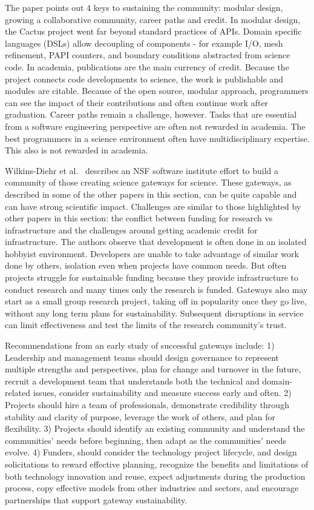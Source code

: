 \documentclass[11pt, oneside]{amsart}
\begin{document}
The paper points out 4 keys to sustaining the community: modular design,
growing a collaborative community, career paths and credit. In modular design,
the Cactus project went far beyond standard practices of APIs. Domain specific
languages (DSLs) allow decoupling of components - for example I/O, mesh
refinement, PAPI counters, and boundary conditions abstracted from science
code. In academia, publications are the main currency of credit. Because the
project connects code developments to science, the work is publishable and
modules are citable. Because of the open source, modular approach, programmers
can see the impact of their contributions and often continue work after
graduation. Career paths remain a challenge, however. Tasks that are essential
from a software engineering perspective are often not rewarded in academia. The
best programmers in a science environment often have multidisciplinary
expertise. This also is not rewarded in academia.

Wilkins-Diehr et al.~\cite{Wilkins-Diehr_WSSSPE} describes an NSF software institute effort to build a
community of those creating science gateways for science. These
gateways, as described in some of the other papers in this section, can be
quite capable and can have strong scientific impact.
Challenges are similar to those highlighted by other papers in this section:
the conflict between funding for research vs infrastructure and the
challenges around getting academic credit for infrastructure.
%
The authors observe that  development is
often done in an isolated hobbyist environment. Developers are unable to take
advantage of similar work done by others, isolation even when projects have
common needs. But often projects struggle for sustainable funding because they
provide infrastructure to conduct research and many times only the research is
funded. Gateways also may start as a small group research project, taking off in
popularity once they go live, without any long term plans for sustainability.
Subsequent disruptions in
service can limit effectiveness and test the limits of the research community's
trust. %

Recommendations from an early study of successful gateways include:
1) Leadership and management teams should design governance to
represent multiple strengths and perspectives, plan for change and turnover in
the future, recruit a development team that understands both the technical and
domain-related issues, consider sustainability and measure success early and
often. 2) Projects should hire a team of
professionals, demonstrate credibility through stability and clarity of
purpose, leverage the work of others, and plan for flexibility. 3) Projects should
identify an existing community and understand the communities' needs
before beginning, then adapt as the communities' needs evolve. 4) Funders,
should consider the technology project lifecycle, and design solicitations
to reward effective planning, recognize the benefits and
limitations of both technology innovation and reuse, expect adjustments during
the production process, copy effective models from other industries and
sectors, and encourage partnerships that support gateway sustainability.
\end{document}
